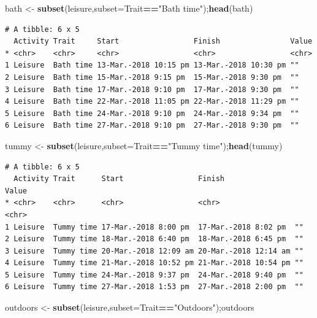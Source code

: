 \documentclass[10,portrait]{article}
\newenvironment{Shaded}{\begin{snugshade}}{\end{snugshade}}
\newcommand{\KeywordTok}[1]{\textcolor[rgb]{0.13,0.29,0.53}{\textbf{#1}}}
\newcommand{\DataTypeTok}[1]{\textcolor[rgb]{0.13,0.29,0.53}{#1}}
\newcommand{\StringTok}[1]{\textcolor[rgb]{0.31,0.60,0.02}{#1}}
\newcommand{\OperatorTok}[1]{\textcolor[rgb]{0.81,0.36,0.00}{\textbf{#1}}}
\newcommand{\NormalTok}[1]{#1}
\begin{document}
\begin{Shaded}
\begin{Highlighting}[]
\NormalTok{bath <-}\StringTok{ }\KeywordTok{subset}\NormalTok{(leisure,}\DataTypeTok{subset=}\NormalTok{Trait}\OperatorTok{==}\StringTok{"Bath time"}\NormalTok{);}\KeywordTok{head}\NormalTok{(bath)}
\end{Highlighting}
\end{Shaded}

\begin{verbatim}
# A tibble: 6 x 5
  Activity Trait     Start                 Finish                Value
* <chr>    <chr>     <chr>                 <chr>                 <chr>
1 Leisure  Bath time 13-Mar.-2018 10:15 pm 13-Mar.-2018 10:30 pm ""   
2 Leisure  Bath time 15-Mar.-2018 9:15 pm  15-Mar.-2018 9:30 pm  ""   
3 Leisure  Bath time 17-Mar.-2018 9:10 pm  17-Mar.-2018 9:30 pm  ""   
4 Leisure  Bath time 22-Mar.-2018 11:05 pm 22-Mar.-2018 11:29 pm ""   
5 Leisure  Bath time 24-Mar.-2018 9:10 pm  24-Mar.-2018 9:34 pm  ""   
6 Leisure  Bath time 27-Mar.-2018 9:10 pm  27-Mar.-2018 9:30 pm  ""   
\end{verbatim}

\begin{Shaded}
\begin{Highlighting}[]
\NormalTok{tummy <-}\StringTok{ }\KeywordTok{subset}\NormalTok{(leisure,}\DataTypeTok{subset=}\NormalTok{Trait}\OperatorTok{==}\StringTok{"Tummy time"}\NormalTok{);}\KeywordTok{head}\NormalTok{(tummy)}
\end{Highlighting}
\end{Shaded}

\begin{verbatim}
# A tibble: 6 x 5
  Activity Trait      Start                 Finish                Value
* <chr>    <chr>      <chr>                 <chr>                 <chr>
1 Leisure  Tummy time 17-Mar.-2018 8:00 pm  17-Mar.-2018 8:02 pm  ""   
2 Leisure  Tummy time 18-Mar.-2018 6:40 pm  18-Mar.-2018 6:45 pm  ""   
3 Leisure  Tummy time 20-Mar.-2018 12:09 am 20-Mar.-2018 12:14 am ""   
4 Leisure  Tummy time 21-Mar.-2018 10:52 pm 21-Mar.-2018 10:54 pm ""   
5 Leisure  Tummy time 24-Mar.-2018 9:37 pm  24-Mar.-2018 9:40 pm  ""   
6 Leisure  Tummy time 27-Mar.-2018 1:53 pm  27-Mar.-2018 2:00 pm  ""   
\end{verbatim}

\begin{Shaded}
\begin{Highlighting}[]
\NormalTok{outdoors <-}\StringTok{ }\KeywordTok{subset}\NormalTok{(leisure,}\DataTypeTok{subset=}\NormalTok{Trait}\OperatorTok{==}\StringTok{"Outdoors"}\NormalTok{);outdoors}
\end{Highlighting}
\end{Shaded}
\end{document}
